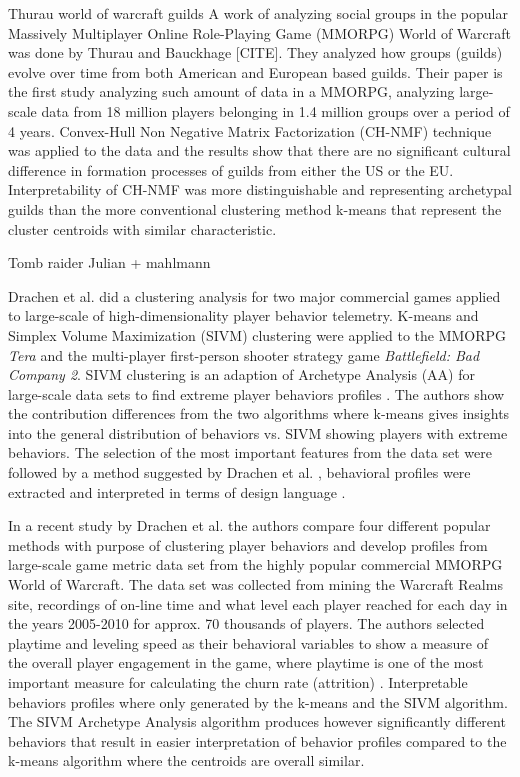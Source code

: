 Thurau world of warcraft guilds
A work of analyzing social groups in the popular Massively Multiplayer Online Role-Playing Game (MMORPG) World of Warcraft was done by Thurau and Bauckhage [CITE]. They analyzed how groups (guilds) evolve over time from both American and European based guilds. Their paper is the first study analyzing such amount of data in a MMORPG, analyzing large-scale data from 18 million players belonging in 1.4 million groups over a period of 4 years. Convex-Hull Non Negative Matrix Factorization (CH-NMF) technique was applied to the data and the results show that there are no significant cultural difference in formation processes of guilds from either the US or the EU. Interpretability of CH-NMF was more distinguishable and representing archetypal guilds than the more conventional clustering method k-means that represent the cluster centroids with similar characteristic.

Tomb raider Julian + mahlmann

Drachen et al. \citep{Drachen:2012} did a clustering analysis for two major commercial games applied to large-scale of high-dimensionality player behavior telemetry. K-means and Simplex Volume Maximization (SIVM) clustering were applied to the MMORPG \textit{Tera} and the multi-player first-person shooter strategy game \textit{Battlefield: Bad Company 2}. SIVM clustering is an adaption of Archetype Analysis (AA) for large-scale data sets to find extreme player behaviors profiles \citep{Thurau:2009SVIM, Kersting:2010SVIM}. The authors show the contribution differences from the two algorithms where k-means gives insights into the general distribution of behaviors vs. SIVM showing players with extreme behaviors. The selection of the most important features from the data set were followed by a method suggested by Drachen et al. \citep{Drachen:2009Tomb}, behavioral profiles were extracted and interpreted in terms of design language \citep{Drachen:2009Tomb, Zoeller:2010}.

In a recent study by Drachen et al. \citep{Drachen:2013} the authors compare four different popular methods with purpose of clustering player behaviors and develop profiles from large-scale game metric data set from the highly popular commercial MMORPG World of Warcraft. The data set was collected from mining the Warcraft Realms site, recordings of on-line time and what level each player reached for each day in the years 2005-2010 for approx. 70 thousands of players. The authors selected playtime and leveling speed as their behavioral variables to show a measure of the overall player engagement in the game, where playtime is one of the most important measure for calculating the churn rate (attrition) \citep{Fields:2011SocialGame, Seif:2013GameAnalytics}. Interpretable behaviors profiles where only generated by the k-means and the SIVM algorithm. The SIVM Archetype Analysis algorithm produces however significantly different behaviors that result in easier interpretation of behavior profiles compared to the k-means algorithm where the centroids are overall similar.	

